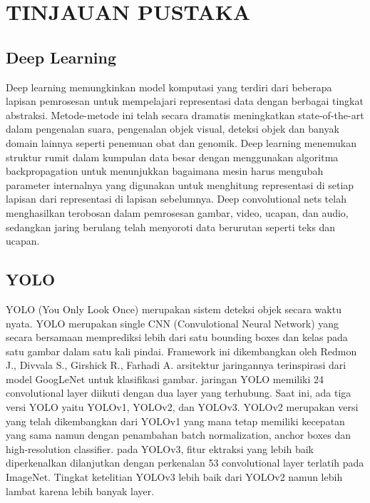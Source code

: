 \section{TINJAUAN PUSTAKA}

\subsection{Deep Learning}


Deep learning memungkinkan model komputasi yang terdiri dari beberapa lapisan pemrosesan untuk mempelajari representasi data dengan berbagai tingkat abstraksi. Metode-metode ini telah secara dramatis meningkatkan state-of-the-art dalam pengenalan suara, pengenalan objek visual, deteksi objek dan banyak domain lainnya seperti penemuan obat dan genomik. Deep learning menemukan struktur rumit dalam kumpulan data besar dengan menggunakan algoritma backpropagation untuk menunjukkan bagaimana mesin harus mengubah parameter internalnya yang digunakan untuk menghitung representasi di setiap lapisan dari representasi di lapisan sebelumnya. Deep convolutional nets telah menghasilkan terobosan dalam pemrosesan gambar, video, ucapan, dan audio, sedangkan jaring berulang telah menyoroti data berurutan seperti teks dan ucapan.

\subsection{YOLO}
YOLO (You Only Look Once) merupakan sistem deteksi objek secara waktu nyata. YOLO merupakan single CNN (Convulotional Neural Network) yang secara bersamaan memprediksi lebih dari satu bounding boxes dan kelas pada satu gambar dalam satu kali pindai. Framework ini dikembangkan oleh Redmon J., Divvala S., Girshick R., Farhadi A. arsitektur jaringannya terinspirasi dari model GoogLeNet untuk klasifikasi gambar. jaringan YOLO memiliki 24 convolutional layer diikuti dengan dua layer yang terhubung.
Saat ini, ada tiga versi YOLO yaitu YOLOv1, YOLOv2, dan YOLOv3. YOLOv2 merupakan versi yang telah dikembangkan dari YOLOv1 yang mana tetap memiliki kecepatan yang sama namun dengan penambahan batch normalization, anchor boxes dan high-resolution classifier. pada YOLOv3, fitur ektraksi yang lebih baik diperkenalkan dilanjutkan dengan perkenalan 53 convolutional layer terlatih pada ImageNet. Tingkat ketelitian YOLOv3 lebih baik dari YOLOv2 namun lebih lambat karena lebih banyak layer.

